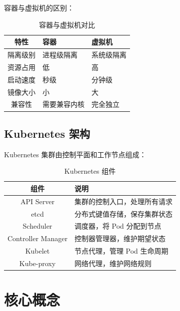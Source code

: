 \documentclass[12pt,UTF8]{ctexbook}
\begin{document}
容器与虚拟机的区别：
\begin{table}[htbp]
    \centering
    \caption{容器与虚拟机对比}
    \begin{tabular}{|c|p{5cm}|p{5cm}|}
        \hline
        \textbf{特性} & \textbf{容器} & \textbf{虚拟机} \\
        \hline
        隔离级别 & 进程级隔离 & 系统级隔离 \\
        \hline
        资源占用 & 低 & 高 \\
        \hline
        启动速度 & 秒级 & 分钟级 \\
        \hline
        镜像大小 & 小 & 大 \\
        \hline
        兼容性 & 需要兼容内核 & 完全独立 \\
        \hline
    \end{tabular}
\end{table}

\section{Kubernetes 架构}
\label{sec:k8s_architecture}

Kubernetes 集群由控制平面和工作节点组成：

\begin{table}[htbp]
    \centering
    \caption{Kubernetes 组件}
    \begin{tabular}{|c|p{8cm}|}
        \hline
        \textbf{组件} & \textbf{说明} \\
        \hline
        API Server & 集群的控制入口，处理所有请求 \\
        \hline
        etcd & 分布式键值存储，保存集群状态 \\
        \hline
        Scheduler & 调度器，将 Pod 分配到节点 \\
        \hline
        Controller Manager & 控制器管理器，维护期望状态 \\
        \hline
        Kubelet & 节点代理，管理 Pod 生命周期 \\
        \hline
        Kube-proxy & 网络代理，维护网络规则 \\
        \hline
    \end{tabular}
\end{table}

\chapter{核心概念}
\label{chap:core_concepts}
\end{document}
